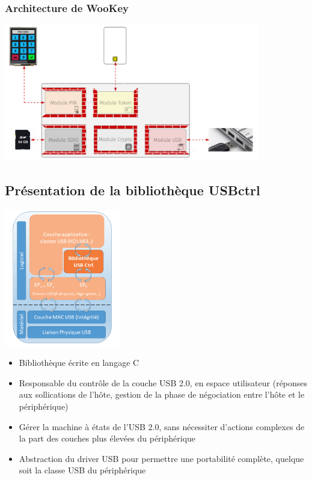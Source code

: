\documentclass[french]{beamer}
\begin{document}
\begin{frame}[t] %
\frametitle{Architecture de WooKey}

\begin{center}
 \includegraphics[height=6cm]{images/architecture_wookey.png}
\end{center}


\end{frame}

\subsection{Présentation de la bibliothèque USBctrl}

\begin{frame}

\begin{center}
 \includegraphics[height=6cm]{images/schema_usbctrl.png}
\end{center}

\begin{itemize}
	\item \tiny Bibliothèque écrite en langage C
	\item \tiny Responsable du contrôle de la couche USB 2.0, en espace utilisateur (réponses aux sollications de l'hôte, gestion de la phase de négociation entre l'hôte et le périphérique)
	\item \tiny Gérer la machine à états de l'USB 2.0, sans nécessiter d'actions complexes de la part des couches plus élevées du périphérique
	\item \tiny Abstraction du driver USB pour permettre une portabilité complète, quelque soit la classe USB du périphérique
\end{itemize}

\end{frame}
\end{document}
